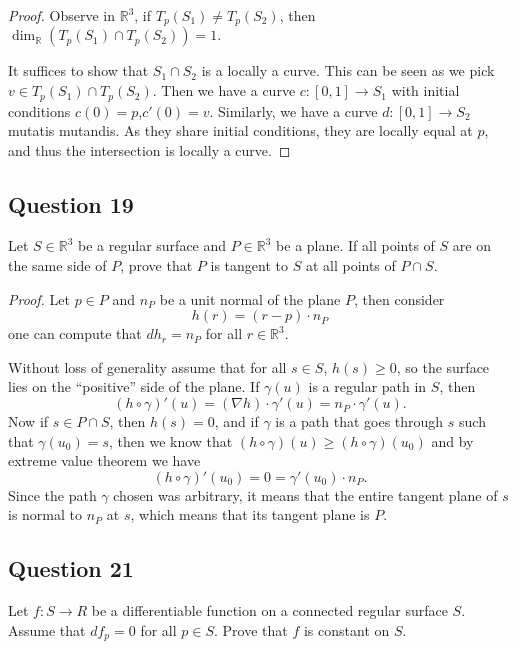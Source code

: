 \documentclass[12pt]{article}
\begin{document}
\begin{proof}
    Observe in $\mathbb R^3$, if $T_p(S_1) \neq T_p(S_2)$,
    then $\dim_\mathbb{R} (T_p(S_1) \cap T_p(S_2)) = 1.$

    It suffices to show that $S_1 \cap S_2$ is a locally a curve.
    This can be seen as we pick $v \in T_p(S_1)\cap T_p(S_2)$. Then
    we have a curve $c: [0,1] \to S_1$ with initial conditions $c(0) = p$,$c'(0) = v$.
    Similarly, we have a curve $d:[0,1] \to S_2$ mutatis mutandis.
    As they share initial conditions, they are locally equal at $p$, and thus the intersection is locally a curve.
\end{proof}

\subsection*{Question 19}

Let \(S \in \mathbb{R}^3\) be a regular surface and \(P \in \mathbb{R}^3\) be a plane.
If all points of \(S\) are on the same side of \(P\), prove that \(P\) is tangent to \(S\) at all points of \(P \cap S\).

\emph{Proof.}
Let \(p \in P\) and \(n_P\) be a unit normal of the plane \(P\), then consider \[ h(r) = (r - p)\cdot n_P \]
one can compute that \(dh_r = n_P\) for all \(r\in \mathbb{R}^3\).

Without loss of generality assume that for all \(s\in S\), \(h(s) \geq 0\), so the surface lies on the ``positive'' side of the plane.
If \(\gamma(u)\) is a regular path in \(S\), then
\[ (h\circ \gamma)'(u) = (\nabla h)\cdot \gamma'(u) = n_P \cdot \gamma'(u).\]
Now if \(s \in P\cap S\), then \(h(s) = 0\),
and if \(\gamma\) is a path that goes through \(s\) such that \(\gamma(u_0) = s\),
then we know that \((h\circ\gamma)(u) \geq (h\circ\gamma)(u_0)\) and by extreme value theorem we have
\[ (h\circ\gamma)'(u_0) = 0 = \gamma'(u_0)\cdot n_P. \]
Since the path \(\gamma\) chosen was arbitrary, it means that the entire tangent plane of \(s\) is normal to \(n_P\) at \(s\), which means that its tangent plane is \(P\).

\subsection*{Question 21}

Let \(f: S\to R\) be a differentiable function on a connected regular surface \(S\).
Assume that \(df_p = 0\) for all \(p\in S\).
Prove that \(f\) is constant on \(S\).
\end{document}
